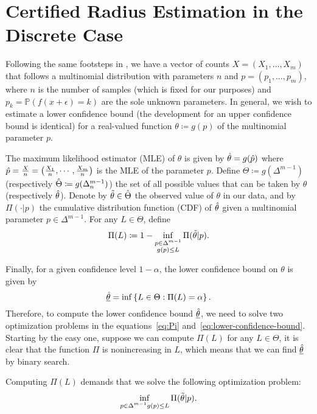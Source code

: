 \section{Certified Radius Estimation in the Discrete Case}\label{sec:discrete}
Following the same footsteps in , we have a vector of counts $X = (X_1, \ldots, X_m)$ that follows a multinomial distribution with parameters $n$ and $p = (p_1, \ldots, p_m)$, where $n$ is the number of samples (which is fixed for our purposes) and $p_k = \mathbb{P}(f(x + \epsilon) = k)$ are the sole unknown parameters.
In general, we wish to estimate a lower confidence bound (the development for an upper confidence bound is identical) for a real-valued function $\theta\coloneqq g(p)$ of the multinomial parameter $p$.

The maximum likelihood estimator (MLE) of $\theta$ is given by $\Hat{\theta}=g(\Hat{p})$ where $\Hat{p} = \frac{X}{n}=\left(\frac{X_1}{n}, \cdots, \frac{X_m}{n}\right)$ is the MLE of the parameter $p$.
Define $\Theta\coloneqq g(\Delta^{m-1})$ (respectively $\Hat{\Theta}\coloneqq g(\Delta^{m-1}_n)$) the set of all possible values that can be taken by $\theta$ (respectively $\Hat{\theta}$).
Denote by $\Tilde{\theta}\in\Hat{\Theta}$ the observed value of $\theta$ in our data, and by $\Pi(\cdot|p)$ the cumulative distribution function (CDF) of $\Hat{\theta}$ given a multinomial parameter $p\in\Delta^{m-1}$.
For any $L\in\Theta$, define
\begin{equation}
    \Pi(L)\coloneqq1-\inf_{\substack{p\in\Delta^{m-1}\\g(p)\leq L}}\Pi(\Tilde{\theta}|p).\label{eq:Pi}
\end{equation}

Finally, for a given confidence level $1-\alpha$, the lower confidence bound on $\theta$ is given by
\begin{equation}
    \underline{\Hat{\theta}} = \inf\left\{ L\in\Theta : \Pi(L) = \alpha \right\}.\label{eq:lower-confidence-bound}
\end{equation}
Therefore, to compute the lower confidence bound $\underline{\Hat{\theta}}$, we need to solve two optimization problems in the equations~\eqref{eq:Pi} and~\eqref{eq:lower-confidence-bound}.
Starting by the easy one, suppose we can compute $\Pi(L)$ for any $L\in\Theta$, it is clear that the function $\Pi$ is nonincreasing in $L$, which means that we can find $\underline{\Hat{\theta}}$ by binary search.

Computing $\Pi(L)$ demands that we solve the following optimization problem:
\begin{equation}
    \inf_{\substack{p\in\Delta^{m-1}g(p)\leq L}}\Pi(\Tilde{\theta}|p).\label{eq:Pi-optimization}
\end{equation}

